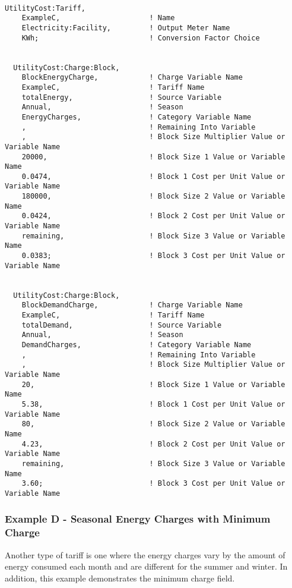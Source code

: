 \begin{lstlisting}

UtilityCost:Tariff,
    ExampleC,                     ! Name
    Electricity:Facility,         ! Output Meter Name
    KWh;                          ! Conversion Factor Choice


  UtilityCost:Charge:Block,
    BlockEnergyCharge,            ! Charge Variable Name
    ExampleC,                     ! Tariff Name
    totalEnergy,                  ! Source Variable
    Annual,                       ! Season
    EnergyCharges,                ! Category Variable Name
    ,                             ! Remaining Into Variable
    ,                             ! Block Size Multiplier Value or Variable Name
    20000,                        ! Block Size 1 Value or Variable Name
    0.0474,                       ! Block 1 Cost per Unit Value or Variable Name
    180000,                       ! Block Size 2 Value or Variable Name
    0.0424,                       ! Block 2 Cost per Unit Value or Variable Name
    remaining,                    ! Block Size 3 Value or Variable Name
    0.0383;                       ! Block 3 Cost per Unit Value or Variable Name


  UtilityCost:Charge:Block,
    BlockDemandCharge,            ! Charge Variable Name
    ExampleC,                     ! Tariff Name
    totalDemand,                  ! Source Variable
    Annual,                       ! Season
    DemandCharges,                ! Category Variable Name
    ,                             ! Remaining Into Variable
    ,                             ! Block Size Multiplier Value or Variable Name
    20,                           ! Block Size 1 Value or Variable Name
    5.38,                         ! Block 1 Cost per Unit Value or Variable Name
    80,                           ! Block Size 2 Value or Variable Name
    4.23,                         ! Block 2 Cost per Unit Value or Variable Name
    remaining,                    ! Block Size 3 Value or Variable Name
    3.60;                         ! Block 3 Cost per Unit Value or Variable Name
\end{lstlisting}

\subsubsection{Example D - Seasonal Energy Charges with Minimum Charge}\label{example-d---seasonal-energy-charges-with-minimum-charge}

Another type of tariff is one where the energy charges vary by the amount of energy consumed each month and are different for the summer and winter. In addition, this example demonstrates the minimum charge field.


